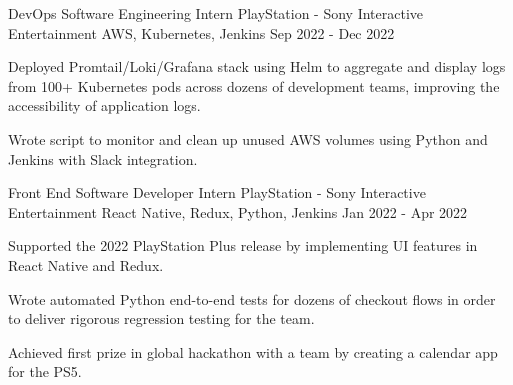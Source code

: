 

\begin{cventries}

  \cventry
    {DevOps Software Engineering Intern} %
    {PlayStation - Sony Interactive Entertainment} %
    {AWS, Kubernetes, Jenkins} %
    {Sep 2022 - Dec 2022} %
    {
      \begin{cvitems} %
        \item {Deployed Promtail/Loki/Grafana stack using Helm to aggregate and display logs from 100+ Kubernetes pods across dozens of development teams, improving the accessibility of application logs.}
        \item {Wrote script to monitor and clean up unused AWS volumes using Python and Jenkins with Slack integration.}
      \end{cvitems}
    }

  \cventry
    {Front End Software Developer Intern} %
    {PlayStation - Sony Interactive Entertainment} %
    {React Native, Redux, Python, Jenkins} %
    {Jan 2022 - Apr 2022} %
    {
      \begin{cvitems} %
        \item {Supported the 2022 PlayStation Plus release by implementing UI features in React Native and Redux.}
        \item {Wrote automated Python end-to-end tests for dozens of checkout flows in order to deliver rigorous regression testing for the team.} 
        \item {Achieved first prize in global hackathon with a team by creating a calendar app for the PS5.}
      \end{cvitems}
    }



\end{cventries}
